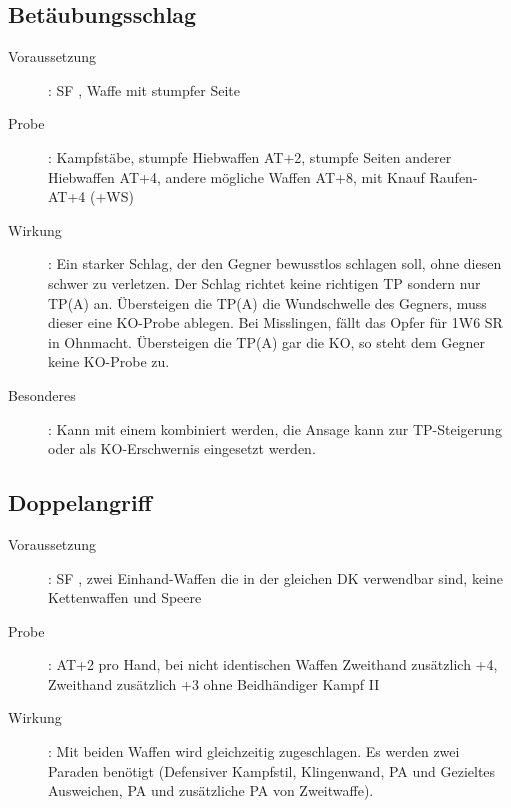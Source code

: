 \subsection{Betäubungsschlag }
\label{chap.bAT.betaeubungsschlag}
\begin{description}
    \item[Voraussetzung]: SF , Waffe mit stumpfer
        Seite
    \item[Probe]: Kampfstäbe, stumpfe Hiebwaffen AT+2, stumpfe Seiten anderer
        Hiebwaffen AT+4, andere mögliche Waffen AT+8, mit Knauf Raufen-AT+4
        (+WS)
    \item[Wirkung]: Ein starker Schlag, der den Gegner bewusstlos schlagen
        soll, ohne diesen schwer zu verletzen. Der Schlag richtet keine
        richtigen TP sondern nur TP(A) an. Übersteigen die TP(A) die
        Wundschwelle des Gegners, muss dieser eine KO-Probe ablegen. Bei
        Misslingen, fällt das Opfer für 1W6 SR in Ohnmacht. Übersteigen die
        TP(A) gar die KO, so steht dem Gegner keine KO-Probe zu.
    \item[Besonderes]: Kann mit einem  kombiniert
        werden, die Ansage kann zur TP-Steigerung oder als KO-Erschwernis
        eingesetzt werden.
\end{description}

\subsection{Doppelangriff }
\label{chap.bAT.doppelangriff}
\begin{description}
    \item[Voraussetzung]: SF , zwei Einhand-Waffen
        die in der gleichen DK verwendbar sind, keine Kettenwaffen und Speere
    \item[Probe]: AT+2 pro Hand, bei nicht identischen Waffen Zweithand
        zusätzlich +4, Zweithand zusätzlich +3 ohne Beidhändiger Kampf II
    \item[Wirkung]: Mit beiden Waffen wird gleichzeitig zugeschlagen. Es werden
        zwei Paraden benötigt (Defensiver Kampfstil, Klingenwand, PA und
        Gezieltes Ausweichen, PA und zusätzliche PA von Zweitwaffe).
\end{description}

